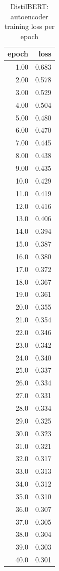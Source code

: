 \begin{table}[ht]
\centering
\caption{DistilBERT: autoencoder training loss per epoch}
\label{tab:distilbert_ae_training_losses}
\begin{tabular}{rr}
\toprule
epoch & loss \\
\midrule
1.00 & 0.683 \\
2.00 & 0.578 \\
3.00 & 0.529 \\
4.00 & 0.504 \\
5.00 & 0.480 \\
6.00 & 0.470 \\
7.00 & 0.445 \\
8.00 & 0.438 \\
9.00 & 0.435 \\
10.0 & 0.429 \\
11.0 & 0.419 \\
12.0 & 0.416 \\
13.0 & 0.406 \\
14.0 & 0.394 \\
15.0 & 0.387 \\
16.0 & 0.380 \\
17.0 & 0.372 \\
18.0 & 0.367 \\
19.0 & 0.361 \\
20.0 & 0.355 \\
21.0 & 0.354 \\
22.0 & 0.346 \\
23.0 & 0.342 \\
24.0 & 0.340 \\
25.0 & 0.337 \\
26.0 & 0.334 \\
27.0 & 0.331 \\
28.0 & 0.334 \\
29.0 & 0.325 \\
30.0 & 0.323 \\
31.0 & 0.321 \\
32.0 & 0.317 \\
33.0 & 0.313 \\
34.0 & 0.312 \\
35.0 & 0.310 \\
36.0 & 0.307 \\
37.0 & 0.305 \\
38.0 & 0.304 \\
39.0 & 0.303 \\
40.0 & 0.301 \\
\bottomrule
\end{tabular}
\end{table}
